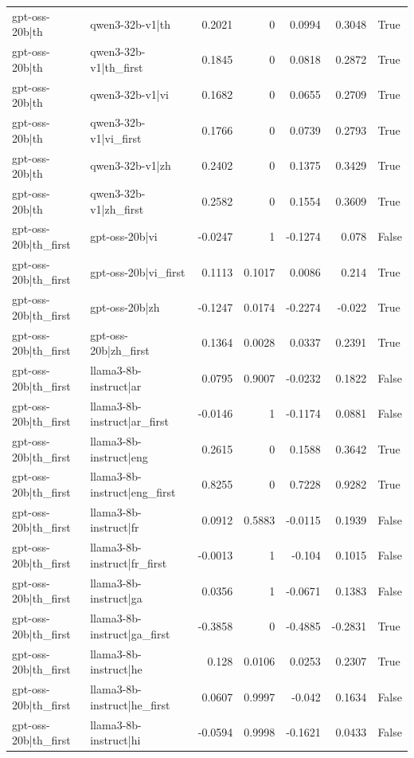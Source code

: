 \begin{table}
\begin{tabular}{l l r r r r l}
gpt-oss-20b|th & qwen3-32b-v1|th & 0.2021 & 0 & 0.0994 & 0.3048 & True \\
gpt-oss-20b|th & qwen3-32b-v1|th_first & 0.1845 & 0 & 0.0818 & 0.2872 & True \\
gpt-oss-20b|th & qwen3-32b-v1|vi & 0.1682 & 0 & 0.0655 & 0.2709 & True \\
gpt-oss-20b|th & qwen3-32b-v1|vi_first & 0.1766 & 0 & 0.0739 & 0.2793 & True \\
gpt-oss-20b|th & qwen3-32b-v1|zh & 0.2402 & 0 & 0.1375 & 0.3429 & True \\
gpt-oss-20b|th & qwen3-32b-v1|zh_first & 0.2582 & 0 & 0.1554 & 0.3609 & True \\
gpt-oss-20b|th_first & gpt-oss-20b|vi & -0.0247 & 1 & -0.1274 & 0.078 & False \\
gpt-oss-20b|th_first & gpt-oss-20b|vi_first & 0.1113 & 0.1017 & 0.0086 & 0.214 & True \\
gpt-oss-20b|th_first & gpt-oss-20b|zh & -0.1247 & 0.0174 & -0.2274 & -0.022 & True \\
gpt-oss-20b|th_first & gpt-oss-20b|zh_first & 0.1364 & 0.0028 & 0.0337 & 0.2391 & True \\
gpt-oss-20b|th_first & llama3-8b-instruct|ar & 0.0795 & 0.9007 & -0.0232 & 0.1822 & False \\
gpt-oss-20b|th_first & llama3-8b-instruct|ar_first & -0.0146 & 1 & -0.1174 & 0.0881 & False \\
gpt-oss-20b|th_first & llama3-8b-instruct|eng & 0.2615 & 0 & 0.1588 & 0.3642 & True \\
gpt-oss-20b|th_first & llama3-8b-instruct|eng_first & 0.8255 & 0 & 0.7228 & 0.9282 & True \\
gpt-oss-20b|th_first & llama3-8b-instruct|fr & 0.0912 & 0.5883 & -0.0115 & 0.1939 & False \\
gpt-oss-20b|th_first & llama3-8b-instruct|fr_first & -0.0013 & 1 & -0.104 & 0.1015 & False \\
gpt-oss-20b|th_first & llama3-8b-instruct|ga & 0.0356 & 1 & -0.0671 & 0.1383 & False \\
gpt-oss-20b|th_first & llama3-8b-instruct|ga_first & -0.3858 & 0 & -0.4885 & -0.2831 & True \\
gpt-oss-20b|th_first & llama3-8b-instruct|he & 0.128 & 0.0106 & 0.0253 & 0.2307 & True \\
gpt-oss-20b|th_first & llama3-8b-instruct|he_first & 0.0607 & 0.9997 & -0.042 & 0.1634 & False \\
gpt-oss-20b|th_first & llama3-8b-instruct|hi & -0.0594 & 0.9998 & -0.1621 & 0.0433 & False \\

\end{tabular}
\end{table}
